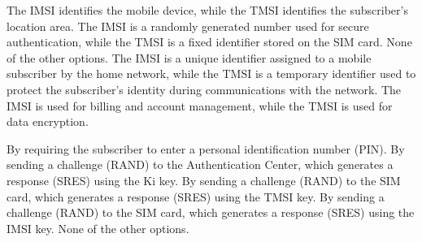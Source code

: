 \begin{checkboxes}
    \choice The IMSI identifies the mobile device, while the TMSI identifies the subscriber's location area.
    \choice The IMSI is a randomly generated number used for secure authentication, while the TMSI is a fixed identifier stored on the SIM card.
    \choice None of the other options.
    \CorrectChoice The IMSI is a unique identifier assigned to a mobile subscriber by the home network, while the TMSI is a temporary identifier used to protect the subscriber's identity during communications with the network.
    \choice The IMSI is used for billing and account management, while the TMSI is used for data encryption.
\end{checkboxes}

\begin{checkboxes}
    \choice By requiring the subscriber to enter a personal identification number (PIN).
    \choice By sending a challenge (RAND) to the Authentication Center, which generates a response (SRES) using the Ki key.
    \choice By sending a challenge (RAND) to the SIM card, which generates a response (SRES) using the TMSI key.
    \choice By sending a challenge (RAND) to the SIM card, which generates a response (SRES) using the IMSI key.
    \CorrectChoice None of the other options.
\end{checkboxes}
